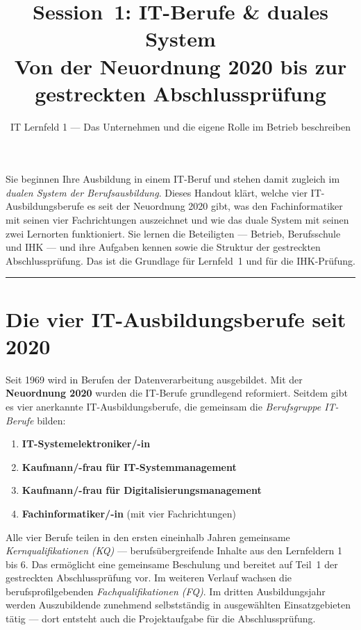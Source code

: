 \documentclass[11pt, a4paper]{article}
\title{\vspace*{-1.5cm}\Huge\bfseries\color{bfwPrimaryDark}Session~1: IT-Berufe \& duales System\\[0.4em]
  \large\color{bfwInkSoft}\textnormal{Von der Neuordnung 2020 bis zur gestreckten Abschlussprüfung}}
\author{\textsf{IT Lernfeld 1 --- Das Unternehmen und die eigene Rolle im Betrieb beschreiben}}
\date{}
\begin{document}
\maketitle
\thispagestyle{empty}

\vspace{1em}
\begin{merksatz}[title={\bfseries Worum geht es in dieser Session?}]
Sie beginnen Ihre Ausbildung in einem IT-Beruf und stehen damit zugleich im \emph{dualen
System der Berufsausbildung}. Dieses Handout klärt, welche vier IT-Ausbildungsberufe es
seit der Neuordnung 2020 gibt, was den Fachinformatiker mit seinen vier Fachrichtungen
auszeichnet und wie das duale System mit seinen zwei Lernorten funktioniert. Sie lernen die
Beteiligten --- Betrieb, Berufsschule und IHK --- und ihre Aufgaben kennen sowie die
Struktur der gestreckten Abschlussprüfung. Das ist die Grundlage für Lernfeld~1 und für
die IHK-Prüfung.
\end{merksatz}

\tableofcontents
\vspace{1em}
\hrule
\vspace{1em}

\section{Die vier IT-Ausbildungsberufe seit 2020}

Seit 1969 wird in Berufen der Datenverarbeitung ausgebildet. Mit der \textbf{Neuordnung
2020} wurden die IT-Berufe grundlegend reformiert. Seitdem gibt es vier anerkannte
IT-Ausbildungsberufe, die gemeinsam die \emph{Berufsgruppe IT-Berufe} bilden:

\begin{enumerate}
  \item \textbf{IT-Systemelektroniker/-in}
  \item \textbf{Kaufmann/-frau für IT-Systemmanagement}
  \item \textbf{Kaufmann/-frau für Digitalisierungsmanagement}
  \item \textbf{Fachinformatiker/-in} (mit vier Fachrichtungen)
\end{enumerate}

Alle vier Berufe teilen in den ersten eineinhalb Jahren gemeinsame
\emph{Kernqualifikationen (KQ)} --- berufsübergreifende Inhalte aus den Lernfeldern
1 bis 6. Das ermöglicht eine gemeinsame Beschulung und bereitet auf Teil~1 der
gestreckten Abschlussprüfung vor. Im weiteren Verlauf wachsen die berufsprofilgebenden
\emph{Fachqualifikationen (FQ)}. Im dritten Ausbildungsjahr werden Auszubildende
zunehmend selbstständig in ausgewählten Einsatzgebieten tätig --- dort entsteht auch die
Projektaufgabe für die Abschlussprüfung.
\end{document}

